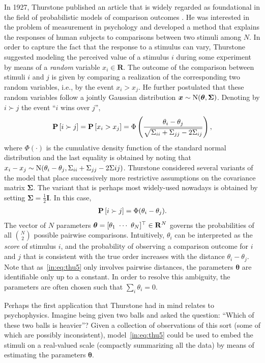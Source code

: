 In 1927, Thurstone published an article that is widely regarded as foundational in the field of probabilistic models of comparison outcomes \citep{thurstone1927law}.
He was interested in the problem of measurement in psychology and developed a method that explains the responses of human subjects to comparisons between two stimuli among $N$.
In order to capture the fact that the response to a stimulus can vary, Thurstone suggested modeling the perceived value of a stimulus $i$ during some experiment by means of a \emph{random} variable $x_i \in \mathbf{R}$.
The outcome of the comparison between stimuli $i$ and $j$ is given by comparing a realization of the corresponding two random variables, i.e., by the event $x_i > x_j$.
He further postulated that these random variables follow a jointly Gaussian distribution $\bm{x} \sim \mathrm{N}( \bm{\theta}, \bm{\Sigma} )$.
Denoting by $i \succ j$ the event ``$i$ wins over $j$'',
\begin{align*}
\mathbf{P}\left[ i \succ j \right] = \mathbf{P}\left[ x_i > x_j \right] = \Phi \left( \frac{\theta_i - \theta_j}{\sqrt{\Sigma_{ii} + \Sigma_{jj} - 2\Sigma_{ij}}} \right),
\end{align*}
where $\Phi(\cdot)$ is the cumulative density function of the standard normal distribution and the last equality is obtained by noting that $x_i - x_j \sim \mathrm{N}( \theta_i - \theta_j, \Sigma_{ii} + \Sigma_{jj} - 2\Sigma{ij} )$.
Thurstone considered several variants of the model that place successively more restrictive assumptions on the covariance matrix $\bm{\Sigma}$.
The variant that is perhaps most widely-used nowadays is obtained by setting $\bm{\Sigma} = \tfrac{1}{2} \bm{I}$.
In this case,
\begin{align}
\label{in:eq:thu5}
\mathbf{P}\left[ i \succ j \right] = \Phi(\theta_i - \theta_j).
\end{align}
The vector of $N$ parameters $\bm{\theta} = [\theta_1 \ \cdots \ \theta_N]^\Tr \in \mathbf{R}^N$ governs the probabilities of all $\binom{N}{2}$ possible pairwise comparisons.
Intuitively, $\theta_i$ can be interpreted as the \emph{score} of stimulus $i$, and the probability of observing a comparison outcome for $i$ and $j$ that is consistent with the true order increases with the distance $\theta_i - \theta_j$.
Note that as~\eqref{in:eq:thu5} only involves pairwise distances, the parameters $\bm{\theta}$ are identifiable only up to a constant.
In order to resolve this ambiguity, the parameters are often chosen such that $\sum_i \theta_i = 0$.

Perhaps the first application that Thurstone had in mind relates to psychophysics.
Imagine being given two balls and asked the question: ``Which of these two balls is heavier''?
Given a collection of observations of this sort (some of which are possibly inconsistent), model~\eqref{in:eq:thu5} could be used to embed the stimuli on a real-valued scale (compactly summarizing all the data) by means of estimating the parameters $\bm{\theta}$.

